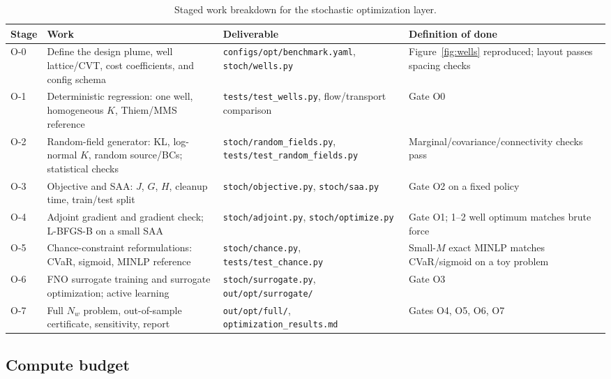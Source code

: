 \documentclass[11pt]{article}
\numberwithin{equation}{section}
\newcommand{\tabhead}[1]{\textbf{#1}}
\theoremstyle{plain}
\begin{document}
\begin{table}[htbp]
\centering
\small
\begin{tabularx}{\textwidth}{@{}lYYY@{}}
\toprule
\tabhead{Stage} & \tabhead{Work} & \tabhead{Deliverable} &
\tabhead{Definition of done}\\
\midrule
O-0 & Define the design plume, well lattice/CVT, cost coefficients, and
config schema & \texttt{configs/opt/}\allowbreak\texttt{benchmark.yaml},
\texttt{stoch/wells.py} & Figure~\ref{fig:wells} reproduced; layout passes
spacing checks\\
O-1 & Deterministic regression: one well, homogeneous $K$, Thiem/MMS
reference & \texttt{tests/}\allowbreak\texttt{test\_wells.py}, flow/transport comparison &
Gate O0\\
O-2 & Random-field generator: KL, log-normal $K$, random source/BCs;
statistical checks & \texttt{stoch/}\allowbreak\texttt{random\_fields.py},
\texttt{tests/}\allowbreak\texttt{test\_random\_fields.py} & Marginal/\allowbreak covariance/\allowbreak connectivity
checks pass\\
O-3 & Objective and SAA: $J$, $G$, $H$, cleanup time, train/test split &
\texttt{stoch/objective.py}, \texttt{stoch/saa.py} & Gate O2 on a fixed
policy\\
O-4 & Adjoint gradient and gradient check; L-BFGS-B on a small SAA &
\texttt{stoch/adjoint.py}, \texttt{stoch/optimize.py} & Gate O1; 1--2 well
optimum matches brute force\\
O-5 & Chance-constraint reformulations: CVaR, sigmoid, MINLP reference &
\texttt{stoch/chance.py}, \texttt{tests/test\_chance.py} & Small-$M$ exact
MINLP matches CVaR/sigmoid on a toy problem\\
O-6 & FNO surrogate training and surrogate optimization; active learning &
\texttt{stoch/surrogate.py}, \texttt{out/opt/surrogate/} & Gate O3\\
O-7 & Full $N_w$ problem, out-of-sample certificate, sensitivity, report &
\texttt{out/opt/full/}, \texttt{optimization\_results.md} & Gates O4, O5,
O6, O7\\
\bottomrule
\end{tabularx}
\caption{Staged work breakdown for the stochastic optimization layer.}
\label{tab:work}
\end{table}

\subsection{Compute budget}
\end{document}
